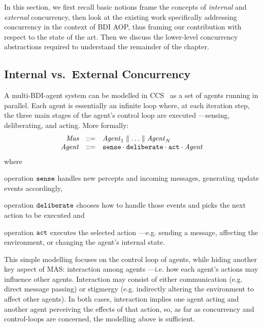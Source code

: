 In this section,
we first recall basic notions frame the concepts of \emph{internal} and \emph{external} concurrency,
then
look at the existing work specifically addressing concurrency in the context of \ac{BDI} \ac{AOP},
thus framing our contribution with respect to the state of the art.
%
Then
we discuss the lower-level concurrency abstractions required to understand the remainder of the chapter.

\subsection{Internal vs.\ External Concurrency}

A multi-\ac{BDI}-agent system can be modelled in \ac{CCS}~\cite{Milner80} as a set of agents running in parallel.
%
Each agent is essentially an infinite loop where, at each iteration step, the three main stages of the agent's control loop are executed%
---sensing, deliberating, and acting.
%
More formally:
%
\begin{equation}\label{eq:external_concurrency}
\begin{array}{rcl}
  \V{mas} & \defeq & \V{agent}_1 \parallel \ldots \parallel \V{agent}_N \\
  \V{agent} & \defeq & \T{sense} \cdot \T{deliberate} \cdot \T{act} \cdot \V{agent} \\
\end{array}
\end{equation}
%
where
%
\begin{inlinelist}
  \item operation $\T{sense}$ handles new percepts and incoming messages, generating update events accordingly,
  \item operation $\T{deliberate}$ chooses how to handle those events and picks the next action to be executed
  and
  \item operation $\T{act}$ executes the selected action%
  ---e.g. sending a message, affecting the environment, or changing the agent's internal state.
\end{inlinelist}

This simple modelling focuses on the control loop of agents,
while hiding another key aspect of \ac{MAS}: interaction among agents%
---i.e. how each agent's actions may influence other agents.
%
Interaction may consist of either communication 
(e.g. direct message passing) 
or stigmergy 
(e.g. indirectly altering the environment to affect other agents).
%
In both cases, 
interaction implies one agent acting and another agent perceiving the effects of that action,
so, as far as concurrency and control-loops are concerned,
the modelling above is sufficient.

